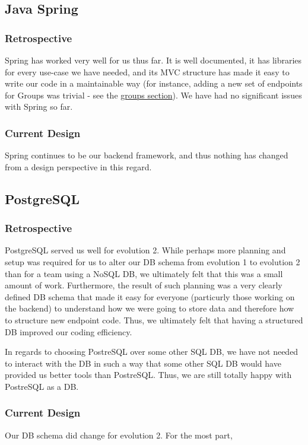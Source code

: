 \documentclass[12pt]{article}
\begin{document}
\subsection{Java Spring}
\subsubsection{Retrospective}
Spring has worked very well for us thus far. It is well documented, it has libraries for every use-case we have needed, and its MVC structure has made it easy to write our code in a maintainable way (for instance, adding a new set of endpoints for Groups was trivial - see the \hyperref[sec:GROUPS]{groups section}). We have had no significant issues with Spring so far. 

\subsubsection{Current Design}
Spring continues to be our backend framework, and thus nothing has changed from a design perspective in this regard.

\subsection{PostgreSQL}
\subsubsection{Retrospective}
PostgreSQL served us well for evolution 2. While perhaps more planning and setup was required for us to alter our DB schema from evolution 1 to evolution 2 than for a team using a NoSQL DB, we ultimately felt that this was a small amount of work. Furthermore, the result of such planning was a very clearly defined DB schema that made it easy for everyone (particurly those working on the backend) to understand how we were going to store data and therefore how to structure new endpoint code. Thus, we ultimately felt that having a structured DB improved our coding efficiency. 

In regards to choosing PostreSQL over some other SQL DB, we have not needed to interact with the DB in such a way that some other SQL DB would have provided us better tools than PostreSQL. Thus, we are still totally happy with PostreSQL as a DB. 

\subsubsection{Current Design}
Our DB schema did change for evolution 2. For the most part,
\end{document}
